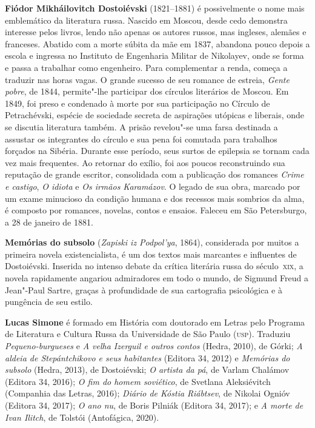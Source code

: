 \textbf{Fiódor Mikháilovitch Dostoiévski} (1821--1881) é possivelmente o nome mais emblemático da literatura russa. Nascido em Moscou, desde cedo demonstra interesse pelos livros, lendo não apenas os autores russos, mas ingleses, alemães e franceses. Abatido com a morte súbita da mãe em 1837, abandona pouco depois a escola e ingressa no Instituto de Engenharia Militar de Nikolayev, onde se forma e passa a trabalhar como engenheiro. Para complementar a renda, começa a traduzir nas horas vagas. O grande sucesso de seu romance de estreia, \textit{Gente pobre}, de 1844, permite"-lhe participar dos círculos literários de Moscou. Em 1849, foi preso e condenado à morte por sua participação no Círculo de Petrachévski, espécie de sociedade secreta de aspirações utópicas e liberais, onde se discutia literatura também. A prisão revelou"-se uma farsa destinada a assustar os integrantes do círculo e sua pena foi comutada para trabalhos forçados na Sibéria. Durante esse período, seus surtos de epilepsia se tornam cada vez mais frequentes. Ao retornar do exílio, foi aos poucos reconstruindo sua reputação de grande escritor, consolidada com a publicação dos romances \textit{Crime e castigo}, \textit{O idiota} e \textit{Os irmãos Karamázov}. O legado de sua obra, marcado por um exame minucioso da condição humana e dos recessos mais sombrios da alma, é composto por romances, novelas, contos e ensaios. Faleceu em São Petersburgo, a 28 de janeiro de 1881.

\textbf{Memórias do subsolo} (\emph{Zapiski iz Podpol’ya}, 1864), considerada por muitos a primeira
novela existencialista, é um dos textos mais marcantes e influentes de Dostoiévski. 
Inserida no intenso debate da crítica literária russa do século~\textsc{xix}, a novela 
rapidamente angariou admiradores em todo o mundo, de Sigmund Freud a Jean"-Paul Sartre,
graças à profundidade de sua cartografia psicológica e à pungência de seu estilo.
        
\textbf{Lucas Simone} é formado em História com doutorado em Letras pelo Programa de Literatura e Cultura Russa da Universidade de São Paulo (\textsc{usp}). Traduziu \textit{Pequeno-burgueses} e \textit{A velha Izerguil e outros contos} (Hedra, 2010), de Górki; \textit{A aldeia de Stepántchikovo e seus habitantes} (Editora 34, 2012) e \textit{Memórias do subsolo} (Hedra, 2013), de Dostoiévski; \textit{O artista da pá}, de Varlam Chalámov (Editora 34, 2016); \textit{O fim do homem soviético}, de Svetlana Aleksiévitch (Companhia das Letras, 2016); \textit{Diário de Kóstia Riábtsev}, de Nikolai Ognióv (Editora 34, 2017); \textit{O ano nu}, de Boris Pilniák (Editora 34, 2017); e \textit{A morte de Ivan Ilitch}, de Tolstói (Antofágica, 2020).


